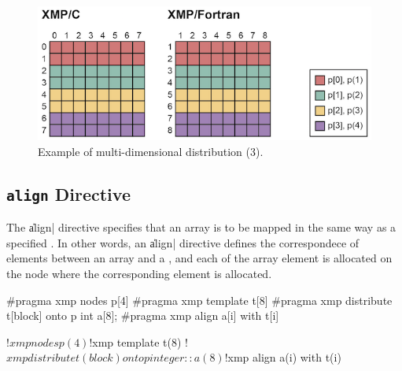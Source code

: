 
\begin{figure}
  \centering
  \includegraphics{figs/multi3.png}
  \caption{Example of multi-dimensional distribution (3).}
\end{figure}


\subsection{{\tt align} Directive}


The \|align| directive specifies that an array is to be mapped in the
same way as a specified {\template}. In other words, an \|align| directive
defines the correspondece of elements between an array and a {\template},
and each of the array element is allocated on the node where the
corresponding {\template} element is allocated.


\begin{XCexample}
#pragma xmp nodes p[4]
#pragma xmp template t[8]
#pragma xmp distribute t[block] onto p
int a[8];
#pragma xmp align a[i] with t[i]
\end{XCexample}

\begin{XFexample}
!$xmp nodes p(4)
!$xmp template t(8)
!$xmp distribute t(block) onto p
integer :: a(8)
!$xmp align a(i) with t(i)
\end{XFexample}


